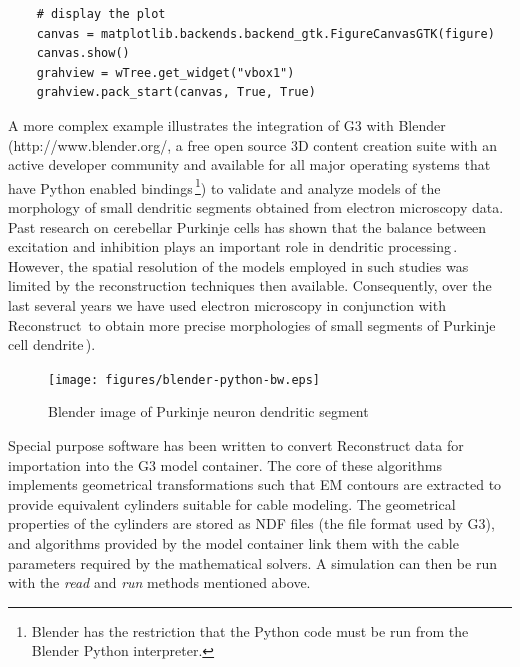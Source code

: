 \documentclass[12pt]{article}
\begin{document}
{{\begin{verbatim}
    # display the plot
    canvas = matplotlib.backends.backend_gtk.FigureCanvasGTK(figure)
    canvas.show()
    grahview = wTree.get_widget("vbox1")
    grahview.pack_start(canvas, True, True)
\end{verbatim}
}

A more complex example illustrates the integration of G3 with Blender
(http://www.blender.org/, a free open source 3D content creation suite
with an active developer community and available for all major
operating systems that have Python enabled bindings\,\footnote{Blender
  has the restriction that the Python code must be run from the
  Blender Python interpreter.}) to validate and analyze models of the
morphology of small dendritic segments obtained from electron
microscopy data. Past research on cerebellar Purkinje cells has shown
that the balance between excitation and inhibition plays an important
role in dendritic processing\,\cite{santamaria02:_modul_purkin,
  mittmann07:_linkin_purkin}.  However, the spatial resolution of the
models employed in such studies was limited by the reconstruction
techniques then available.  Consequently, over the last several years
we have used electron microscopy in conjunction with
Reconstruct\,\cite{jc05:_recon}
to obtain more precise morphologies of small segments of Purkinje cell
dendrite\,\cite{lu09:_d_purkin, cornelis08:_model_neuros_genes}).

\begin{figure}[ht]
  \centering
    \texttt{[image: figures/blender-python-bw.eps]}
  \caption{Blender image of Purkinje neuron dendritic segment}
  \label{fig:cbi-blender}
\end{figure}


Special purpose software has been written to convert Reconstruct data
for importation into the G3 model container.  The core of these
algorithms implements geometrical transformations such that EM
contours are extracted to provide equivalent cylinders suitable for
cable modeling.  The geometrical properties of the cylinders are
stored as NDF files (the file format used by G3), and algorithms
provided by the model container link them with the cable parameters
required by the mathematical solvers.  A simulation can then be run
with the {\it read} and {\it run} methods mentioned above.

}
\end{document}
